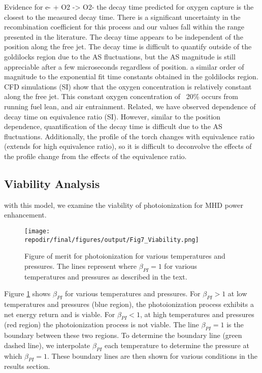 \begin{outline}
    
\1 Evidence for e- + O2 -> O2-
    \2 the decay time predicted for oxygen capture is the closest to the measured decay time. There is a significant uncertainty in the recombination coefficient for this process and our values fall within the range presented in the literature. 
    \2 The decay time appears to be independent of the position along the free jet. The decay time is difficult to quantify outside of the goldilocks region due to the AS fluctuations, but the AS magnitude is still appreciable after a few microseconds regardless of position. a similar order of magnitude to the exponential fit time constants obtained in the goldilocks region. CFD simulations (SI) show that the oxygen concentration is relatively constant along the free jet. This constant oxygen concentration of ~20\% occurs from running fuel lean, and air entrainment. 
    \2 Related, we have observed dependence of decay time on equivalence ratio (SI). However, similar to the position dependence, quantification of the decay time is difficult due to the AS fluctuations. Additionally, the profile of the torch changes with equivalence ratio (extends for high equivalence ratio), so it is difficult to deconvolve the effects of the profile change from the effects of the equivalence ratio.
\end{outline}



\subsection{Viability Analysis}

with this model, we examine the viability of photoionization for MHD power enhancement. 


\begin{figure}[h]
    \centering
    \texttt{[image: \\repodir/final/figures/output/Fig7\_Viability.png]} 
    \caption{Figure of merit for photoionization for various temperatures and pressures. The lines represent where $\beta_{PI} = 1$ for various temperatures and pressures as described in the text.}   
    \label{fig:viability_beta}
\end{figure}

Figure \ref{fig:viability_beta} shows $\beta_{PI}$ for various temperatures and pressures.  For $\beta_{PI} > 1$ at low temperatures and pressures (blue region), the photoionization process exhibits a net energy return and is viable. For $\beta_{PI} < 1$, at high temperatures and pressures (red region) the photoionization process is not viable. The line $\beta_{PI} = 1$ is the boundary between these two regions. To determine the boundary line (green dashed  line), we interpolate $\beta_{PI}$ each temperature to determine the pressure at which $\beta_{PI} = 1$. These boundary lines are then shown for various conditions in the results section.


